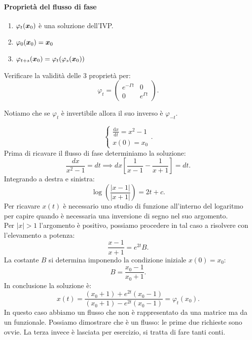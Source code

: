 \paragraph{Proprietà del flusso di fase}%
\label{par:Proprietà del flusso di fase}
\begin{enumerate}
    \item $\varphi_t(\boldsymbol{x}_0)$ è una soluzione dell'IVP.
    \item $\varphi_0(\boldsymbol{x}_0) = \boldsymbol{x}_0$ 
    \item $\varphi_{t+s}(\boldsymbol{x}_0)=\varphi_t(\varphi_s(\boldsymbol{x}_0))$ 
\end{enumerate}
\begin{ex}
    Verificare la validità delle 3 proprietà per:
    \[
        \varphi_t = 
	\begin{pmatrix} 
	    e^{-\Gamma t} & 0 \\
	    0 & e^{\Gamma t} 
        \end{pmatrix} 
    .\] 
\end{ex}
\noindent
Notiamo che se $\varphi_t$  è invertibile allora il suo inverso è $\varphi_{-t}$.  
\begin{exmp}
    \[
        \begin{cases}
            \frac{\text{d} x}{\text{d} t} = x^2-1\\
	    x(0) = x_0
        \end{cases}
    .\] 
    Prima di ricavare il flusso di fase determiniamo la soluzione:
    \[
        \frac{dx}{x^2-1} = dt \implies  dx \left[\frac{1}{x-1}-\frac{1}{x+1}\right] = dt
    .\] 
    Integrando a destra e sinistra:
    \[
	\log (\frac{\left|x-1\right|}{\left|x+1\right|}) = 2t + c
    .\] 
    Per ricavare $x(t)$  è necessario uno studio di funzione all'interno del logaritmo per capire quando è necessaria una inversione di segno nel suo argomento.\\
    Per $\left|x\right| > 1$  l'argomento è positivo, possiamo procedere in tal caso a risolvere con l'elevamento a potenza:
    \[
        \frac{x-1}{x+1}=e^{2t}B
    .\] 
    La costante $B$  si determina imponendo la condizione iniziale $x(0)=x_0$:
    \[
        B=\frac{x_0-1}{x_0+1}
    .\] 
    In conclusione la soluzione è:
    \[
	x(t) = \frac{(x_0+1)+e^{2t}(x_0-1)}{(x_0+1) -e^{2t}(x_0-1)} = \varphi_t(x_0)
    .\] 
    In questo caso abbiamo un flusso che non è rappresentato da una matrice ma da un funzionale. Possiamo dimostrare che è un flusso: le prime due richieste sono ovvie. La terza invece è lasciata per esercizio, si tratta di fare tanti conti.
\end{exmp}
\noindent
